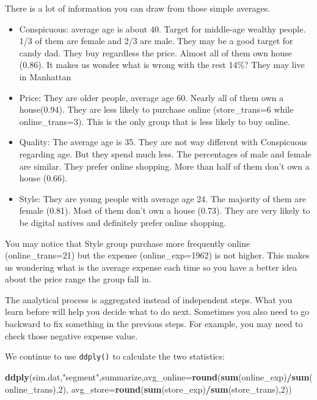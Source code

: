 \documentclass[
]{article}
\newenvironment{Shaded}{\begin{snugshade}}{\end{snugshade}}
\newcommand{\DataTypeTok}[1]{\textcolor[rgb]{0.13,0.29,0.53}{#1}}
\newcommand{\DecValTok}[1]{\textcolor[rgb]{0.00,0.00,0.81}{#1}}
\newcommand{\KeywordTok}[1]{\textcolor[rgb]{0.13,0.29,0.53}{\textbf{#1}}}
\newcommand{\NormalTok}[1]{#1}
\newcommand{\OperatorTok}[1]{\textcolor[rgb]{0.81,0.36,0.00}{\textbf{#1}}}
\newcommand{\StringTok}[1]{\textcolor[rgb]{0.31,0.60,0.02}{#1}}
\begin{document}
There is a lot of information you can draw from those simple averages.

\begin{itemize}
\item
  Conspicuous: average age is about 40. Target for middle-age wealthy
  people. 1/3 of them are female and 2/3 are male. They may be a good
  target for candy dad. They buy regardless the price. Almost all of
  them own house (0.86). It makes us wonder what is wrong with the rest
  14\%? They may live in Manhattan
\item
  Price: They are older people, average age 60. Nearly all of them own a
  house(0.94). They are less likely to purchase online (store\_trans=6
  while online\_trans=3). This is the only group that is less likely to
  buy online.
\item
  Quality: The average age is 35. They are not way different with
  Conspicuous regarding age. But they spend much less. The percentages
  of male and female are similar. They prefer online shopping. More than
  half of them don't own a house (0.66).
\item
  Style: They are young people with average age 24. The majority of them
  are female (0.81). Most of them don't own a house (0.73). They are
  very likely to be digital natives and definitely prefer online
  shopping.
\end{itemize}

You may notice that Style group purchase more frequently online
(online\_trans=21) but the expense (online\_exp=1962) is not higher.
This makes us wondering what is the average expense each time so you
have a better idea about the price range the group fall in.

The analytical process is aggregated instead of independent steps. What
you learn before will help you decide what to do next. Sometimes you
also need to go backward to fix something in the previous steps. For
example, you may need to check those negative expense value.

We continue to use \texttt{ddply()} to calculate the two statistics:

\begin{Shaded}
\begin{Highlighting}[]
\KeywordTok{ddply}\NormalTok{(sim.dat,}\StringTok{"segment"}\NormalTok{,summarize,}\DataTypeTok{avg_online=}\KeywordTok{round}\NormalTok{(}\KeywordTok{sum}\NormalTok{(online_exp)}\OperatorTok{/}\KeywordTok{sum}\NormalTok{(online_trans),}\DecValTok{2}\NormalTok{),}
      \DataTypeTok{avg_store=}\KeywordTok{round}\NormalTok{(}\KeywordTok{sum}\NormalTok{(store_exp)}\OperatorTok{/}\KeywordTok{sum}\NormalTok{(store_trans),}\DecValTok{2}\NormalTok{))}
\end{Highlighting}
\end{Shaded}
\end{document}
